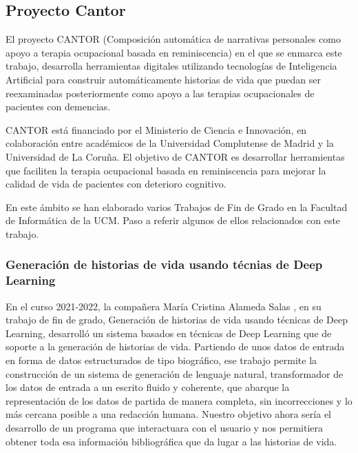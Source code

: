 \subsection{Proyecto Cantor}
El proyecto CANTOR (Composición automática de narrativas personales como apoyo a terapia ocupacional basada en reminiscencia) en el que se enmarca este trabajo, desarrolla herramientas digitales utilizando tecnologías de Inteligencia Artificial para construir automáticamente historias de vida que puedan ser reexaminadas posteriormente como apoyo a las terapias ocupacionales de pacientes con demencias.

CANTOR está financiado por el Ministerio de Ciencia e Innovación, en colaboración entre académicos de la Universidad Complutense de Madrid y la Universidad de La Coruña. El objetivo de CANTOR es desarrollar herramientas que faciliten la terapia ocupacional basada en reminiscencia para mejorar la calidad de vida de pacientes con deterioro cognitivo.

En este ámbito se han elaborado varios Trabajos de Fin de Grado en la Facultad de Informática de la UCM. Paso a referir algunos de ellos relacionados con este trabajo. 

\subsubsection{Generación de historias de vida usando técnias de Deep Learning}
En el curso 2021-2022, la compañera María Cristina Alameda Salas \cite{cristinaalameda}, en su trabajo de fin de grado, Generación de historias de vida
usando técnicas de Deep Learning, desarrolló un sistema basados en técnicas
de Deep Learning que de soporte a la generación de historias de vida. Partiendo de unos datos de entrada en forma de datos estructurados de tipo biográfico, ese trabajo permite la construcción de un sistema de generación de lenguaje natural, transformador de los datos de entrada a un escrito fluido y coherente, que abarque la representación de los datos de partida de manera completa, sin incorrecciones y lo más cercana posible a una redacción humana. Nuestro objetivo ahora sería el desarrollo de un programa que interactuara con el usuario y nos permitiera obtener toda esa información bibliográfica que da lugar a las historias de vida. 
